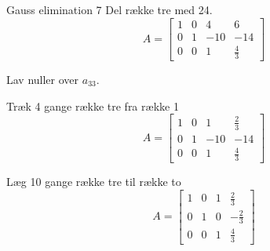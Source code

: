 \documentclass{article}
\begin{document}
\begin{exercise}{Gauss elimination 7}
\hint
Del række tre med 24.
\[
A = \left[\begin{array}{rrr|r}
1 & 0 & 4 & 6 \\
0 & 1 & -10 & -14 \\
0 & 0 & 1 & \frac{4}{3}
\end{array} \right]
\]

\hint
Lav nuller over $a_{33}$.

\hint
Træk 4 gange række tre fra række 1
\[
A = \left[\begin{array}{rrr|r}
1 & 0 & 1 & \frac{2}{3} \\
0 & 1 & -10 & -14 \\
0 & 0 & 1 & \frac{4}{3}
\end{array} \right]
\]

\hint
Læg 10 gange række tre til række to
\[
A = \left[\begin{array}{rrr|r}
1 & 0 & 1 & \frac{2}{3} \\
0 & 1 & 0 & - \frac{2}{3} \\
0 & 0 & 1 & \frac{4}{3}
\end{array} \right]
\]


\end{exercise}

\newpage
\end{document}
